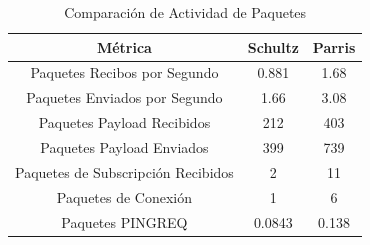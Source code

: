 \begin{table}[H]
\centering
\begin{tabular}{|c|c|c|}
\hline
\textbf{Métrica} & \textbf{Schultz} & \textbf{Parris} \\
\hline
\hspace{30pt}Paquetes Recibos por Segundo\hspace{30pt} &
\hspace{30pt}0.881\hspace{30pt} & 
\hspace{30pt}1.68\hspace{30pt} \\
\hline
\hspace{30pt}Paquetes Enviados por Segundo\hspace{30pt} &
\hspace{30pt}1.66\hspace{30pt} & 
\hspace{30pt}3.08\hspace{30pt} \\
\hline
\hspace{30pt}Paquetes Payload Recibidos\hspace{30pt} &
\hspace{30pt}212\hspace{30pt} & 
\hspace{30pt}403\hspace{30pt} \\
\hline
\hspace{30pt}Paquetes Payload Enviados\hspace{30pt} &
\hspace{30pt}399\hspace{30pt} & 
\hspace{30pt}739\hspace{30pt} \\
\hline
\hspace{30pt}Paquetes de Subscripción Recibidos\hspace{30pt} &
\hspace{30pt}2\hspace{30pt} & 
\hspace{30pt}11\hspace{30pt} \\
\hline
\hspace{30pt}Paquetes de Conexión\hspace{30pt} &
\hspace{30pt}1\hspace{30pt} & 
\hspace{30pt}6\hspace{30pt} \\
\hline
\hspace{30pt}Paquetes PINGREQ\hspace{30pt} &
\hspace{30pt}0.0843\hspace{30pt} & 
\hspace{30pt}0.138\hspace{30pt} \\
\hline
\end{tabular}
\caption{Comparación de Actividad de Paquetes}
\label{packets_com}
\end{table}
